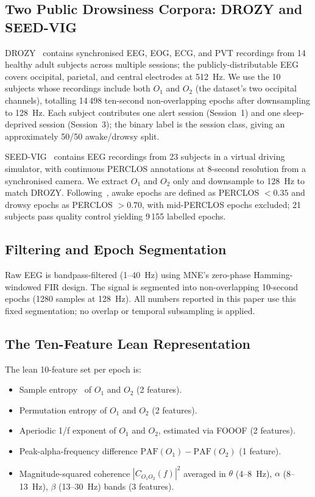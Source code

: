 \documentclass[journal]{IEEEtran}
\DeclareRobustCommand{\add}[1]{#1}                         %
\DeclareRobustCommand{\del}[1]{}                           %
\DeclareRobustCommand{\add}[1]{\hl{#1}}
\DeclareRobustCommand{\del}[1]{{\color{delred}\sout{#1}}\,}
\DeclareRobustCommand{\del}[1]{}                         %
\DeclareRobustCommand{\chg}[2]{\del{#1}\add{#2}}
\begin{document}
\subsection{\chg{Datasets}{Two Public Drowsiness Corpora: DROZY and SEED-VIG}}
DROZY~\cite{drozy2016} contains synchronised EEG, EOG, ECG, and PVT recordings from 14 healthy adult subjects across multiple sessions; the publicly-distributable EEG covers occipital, parietal, and central electrodes at 512~Hz. We use the 10 subjects whose recordings include both \(O_1\) and \(O_2\) (the dataset's two occipital channels), totalling 14\,498 ten-second non-overlapping epochs after downsampling to 128~Hz. Each subject contributes one alert session (Session~1) and one sleep-deprived session (Session~3); the binary label is the session class, giving an approximately 50/50 awake/drowsy split.

SEED-VIG~\cite{zheng2017seedvig} contains EEG recordings from 23 subjects in a virtual driving simulator, with continuous PERCLOS annotations at 8-second resolution from a synchronised camera. We extract \(O_1\) and \(O_2\) only and downsample to 128~Hz to match DROZY. Following~\cite{zheng2017seedvig}, awake epochs are defined as PERCLOS \(<0.35\) and drowsy epochs as PERCLOS \(>0.70\), with mid-PERCLOS epochs excluded; 21 subjects pass quality control yielding 9\,155 labelled epochs.

\subsection{\chg{Signal Processing}{Filtering and Epoch Segmentation}}
Raw EEG is bandpass-filtered (1--40~Hz) using MNE's zero-phase Hamming-windowed FIR design. The signal is segmented into non-overlapping 10-second epochs (1280 samples at 128~Hz). All numbers reported in this paper use this fixed segmentation; no overlap or temporal subsampling is applied.

\subsection{\chg{Feature Set}{The Ten-Feature Lean Representation}}
The lean 10-feature set per epoch is:
\begin{itemize}
    \item Sample entropy~\cite{stancin2021review} of \(O_1\) and \(O_2\) (2 features).
    \item Permutation entropy of \(O_1\) and \(O_2\) (2 features).
    \item Aperiodic 1/f exponent of \(O_1\) and \(O_2\), estimated via FOOOF (2 features).
    \item Peak-alpha-frequency difference \(\mathrm{PAF}(O_1)-\mathrm{PAF}(O_2)\) (1 feature).
    \item Magnitude-squared coherence \(|C_{O_1 O_2}(f)|^2\) averaged in \(\theta\) (4--8~Hz), \(\alpha\) (8--13~Hz), \(\beta\) (13--30~Hz) bands (3 features).
\end{itemize}
\end{document}
